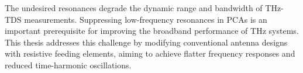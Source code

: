 The undesired resonances degrade the dynamic range and bandwidth of THz-TDS measurements. Suppressing low-frequency resonances in PCAs is an important prerequisite for improving the broadband performance of THz systems. This thesis addresses this challenge by modifying conventional antenna designs with resistive feeding elements, aiming to achieve flatter frequency responses and reduced time-harmonic oscillations.














